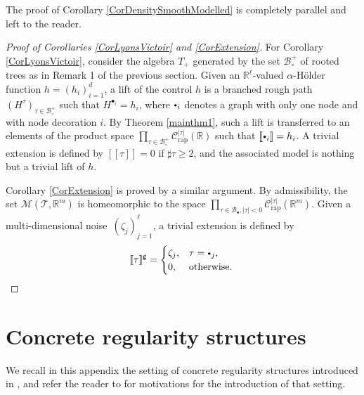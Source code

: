 \documentclass[JEP,XML,SOM,Unicode,published]{cedram}
\newcommand{\sbullet}{{\scriptscriptstyle\bullet}}
\newcommand{\scbullet}{{\raisebox{1pt}{$\sbullet$}}}
\theoremstyle{plain}
\theoremstyle{definition}
\newcommand{\Brac}[1]{[\![#1]\!]}
\newcommand{\rap}{\mathrm{rap}}
\newcommand{\sfg}{\mathsf{g}}
\newcommand{\scrM}{\mathscr{M}}
\newcommand{\scrT}{\mathscr{T}}
\newcommand{\bbR}{\mathbb{R}}
\newcommand{\mcB}{\mathcal{B}}
\newcommand{\mcC}{\mathcal{C}}
\begin{document}
The proof of Corollary \ref{CorDensitySmoothModelled} is completely parallel and left to the reader.

\begin{proof}[Proof of Corollaries \ref{CorLyonsVictoir} and \ref{CorExtension}]
For Corollary \ref{CorLyonsVictoir}, consider the algebra $T_+$ generated by the set $\mcB_\circ^+$ of rooted trees as in Remark 1 of the previous section. Given an $\bbR^\ell$\nobreakdash-valued $\alpha$-Hölder function $h=(h_i)_{i=1}^d$, a lift of the control $h$ is a branched rough path $(H^\tau)_{\tau\in\mcB_\circ^+}$ such that $H^{\sbullet_i}=h_i$, where $\scbullet_i$ denotes a graph with only one node and with node decoration $i$. By Theorem \ref{mainthm1}, such a lift is transferred to an elements of the product space $\prod_{\tau\in\mcB_\circ^+} \mcC_\rap^{|\tau|}(\bbR)$ such that $\Brac{\scbullet_i}=h_i$. A trivial extension is defined by $\Brac{\tau}=0$ if $\sharp\tau\ge2$, and the associated model is nothing but a trivial lift of $h$.

Corollary \ref{CorExtension} is proved by a similar argument. By admissibility, the set $\scrM(\scrT,\bbR^m)$ is homeomorphic to the space $\prod_{\tau\in\mcB_\sbullet, |\tau|<0} \mcC_\rap^{|\tau|}(\bbR^m)$.
Given a multi-dimensional noise~$(\zeta_j)_{j=1}^\ell$, a trivial extension is defined by\vspace*{-3pt}
\[
\Brac{\tau}^{\sfg}=
\begin{cases}
\zeta_j, & \tau=\scbullet_j,\\
0, & \text{otherwise}.
\end{cases} \qedhere
\]
\end{proof}

\appendix
\section{Concrete regularity structures}
\label{SectionAppendixConcreteRS}

We recall in this appendix the setting of concrete regularity structures introduced in \cite{BH}, and refer the reader to \cite[\S2]{BH} for motivations for the introduction of that setting.
\end{document}
